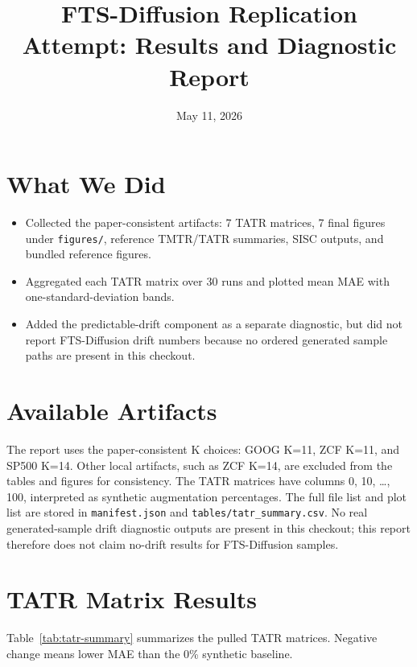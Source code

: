 \documentclass[11pt]{article}
\title{FTS-Diffusion Replication Attempt: Results and Diagnostic Report}
\author{}
\date{May 11, 2026}
\begin{document}
\maketitle

\section{What We Did}

\begin{itemize}
\item Collected the paper-consistent artifacts: 7 TATR matrices, 7 final figures under \texttt{figures/}, reference TMTR/TATR summaries, SISC outputs, and bundled reference figures.
\item Aggregated each TATR matrix over 30 runs and plotted mean MAE with one-standard-deviation bands.
\item Added the predictable-drift component as a separate diagnostic, but did not report FTS-Diffusion drift numbers because no ordered generated sample paths are present in this checkout.
\end{itemize}

\section{Available Artifacts}

The report uses the paper-consistent K choices: GOOG K=11, ZCF K=11, and SP500 K=14. Other local artifacts, such as ZCF K=14, are excluded from the tables and figures for consistency. The TATR matrices have columns 0, 10, \ldots, 100, interpreted as synthetic augmentation percentages. The full file list and plot list are stored in \texttt{manifest.json} and \texttt{tables/tatr\_summary.csv}. No real generated-sample drift diagnostic outputs are present in this checkout; this report therefore does not claim no-drift results for FTS-Diffusion samples.

\section{TATR Matrix Results}

Table~\ref{tab:tatr-summary} summarizes the pulled TATR matrices. Negative change means lower MAE than the 0\% synthetic baseline.
\end{document}
